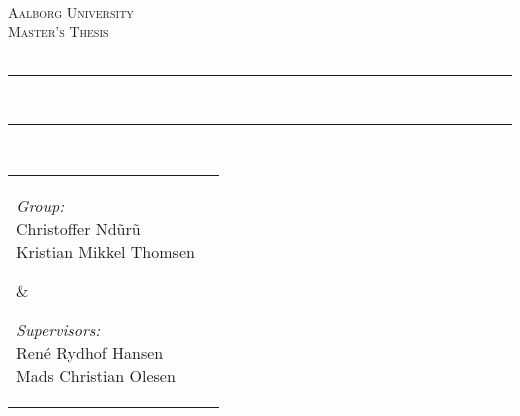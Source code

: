 %
\thispagestyle{empty}

\newcommand{\HRule}{\rule{\linewidth}{0.5mm}} %

\begin{center}
\textsc{}\\[0.5cm]

\textsc{\LARGE Aalborg University}\\[0.8cm]
\textsc{\Large Master's Thesis}\\[0.4cm]
\textsc{\large \projectsubject}\\[0.6cm]

\HRule \\[0.4cm]
{ \huge \bfseries \projecttitle}
\HRule \\[1.3cm]
\begin{tabular}{lr}
\hspace{\fill}\parbox[t]{2.85in}{
\emph{Group:}\\[0.20cm]
    Christoffer Nd\~{u}r\~{u}\\[0.20cm]
    Kristian Mikkel Thomsen
}
&
\hspace{\fill}\parbox[t]{2.85in}{
\emph{Supervisors:}\\[0.20cm]
 René Rydhof Hansen \\ [0.20cm]
 Mads Christian Olesen
}
\hspace{-4in}
\end{tabular}
\begin{minipage}{0.4\textwidth}
\begin{flushleft} \large
\end{flushleft}
\end{minipage} 
~
\begin{minipage}{0.4\textwidth}
\begin{flushright} \large
\end{flushright}
\end{minipage}\\[1.5cm]





\end{center}

